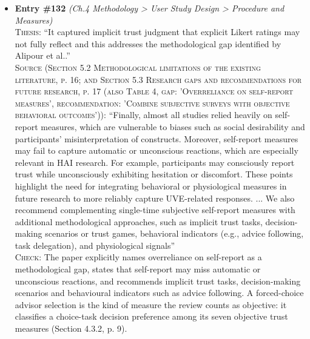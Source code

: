 \documentclass[11pt, a4paper]{article}
\begin{document}
\begin{itemize}[leftmargin=1.2em,itemsep=4pt]
\textsc{Check:} Three of the four numbers are exact (41 empirically testing, 24 conditional/indirect, 10 no effect), but the thesis says 17 studies reported a direct effect whereas the paper states 19. The paper's own subgroup counts confirm 19 (11 in the direct-trust group, p. 12; 3 in the trust-related-constructs group, p. 13; 5 in the trust-related-intentions group, p. 14). Change 17 to 19. The claim that conditional or indirect effects were more common still holds (24 > 19). Note also that these categories overlap: 12 studies were dual coded under both direct and conditional/indirect effects (Fig. 8 caption, p. 11), so the counts do not partition the 41.
\item \textbf{Entry \#132} \textit{(Ch.4 Methodology > User Study Design > Procedure and Measures)}\\
\textsc{Thesis:} ``It captured implicit trust judgment that explicit Likert ratings may not fully reflect and this addresses the methodological gap identified by Alipour et al..''\\
\textsc{Source (Section 5.2 Methodological limitations of the existing literature, p. 16; and Section 5.3 Research gaps and recommendations for future research, p. 17 (also Table 4, gap: 'Overreliance on self-report measures', recommendation: 'Combine subjective surveys with objective behavioral outcomes')):} ``Finally, almost all studies relied heavily on self-report measures, which are vulnerable to biases such as social desirability and participants' misinterpretation of constructs. Moreover, self-report measures may fail to capture automatic or unconscious reactions, which are especially relevant in HAI research. For example, participants may consciously report trust while unconsciously exhibiting hesitation or discomfort. These points highlight the need for integrating behavioral or physiological measures in future research to more reliably capture UVE-related responses. ... We also recommend complementing single-time subjective self-report measures with additional methodological approaches, such as implicit trust tasks, decision-making scenarios or trust games, behavioral indicators (e.g., advice following, task delegation), and physiological signals''\\
\textsc{Check:} The paper explicitly names overreliance on self-report as a methodological gap, states that self-report may miss automatic or unconscious reactions, and recommends implicit trust tasks, decision-making scenarios and behavioural indicators such as advice following. A forced-choice advisor selection is the kind of measure the review counts as objective: it classifies a choice-task decision preference among its seven objective trust measures (Section 4.3.2, p. 9).

\end{itemize}
\end{document}
